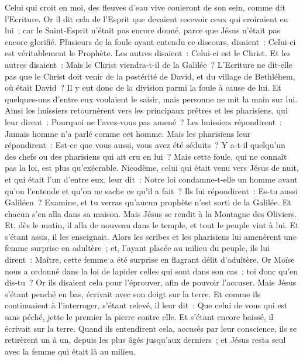 \begin{multicols}{2}
Celui qui croit en moi, des fleuves d'eau vive couleront de son sein, comme dit l'Ecriture.
Or il dit cela de l'Esprit que devaient recevoir ceux qui croiraient en lui~; car le Saint-Esprit n'était pas encore donné, parce que Jésus n'était pas encore glorifié.
Plusieurs de la foule ayant entendu ce discours, disaient~: Celui-ci est véritablement le Prophète.
Les autres disaient~: Celui-ci est le Christ. Et les autres disaient~: Mais le Christ viendra-t-il de la Galilée~?
L'Ecriture ne dit-elle pas que le Christ doit venir de la postérité de David, et du village de Bethléhem, où était David~?
Il y eut donc de la division parmi la foule à cause de lui.
Et quelques-uns d'entre eux voulaient le saisir, mais personne ne mit la main sur lui.
Ainsi les huissiers retournèrent vers les principaux prêtres et les pharisiens, qui leur dirent~: Pourquoi ne l'avez-vous pas amené~?
Les huissiers répondirent~: Jamais homme n'a parlé comme cet homme.
Mais les pharisiens leur répondirent~: Est-ce que vous aussi, vous avez été séduits~?
Y a-t-il quelqu'un des chefs ou des pharisiens qui ait cru en lui~?
Mais cette foule, qui ne connaît pas la loi, est plus qu'exécrable.
Nicodème, celui qui était venu vers Jésus de nuit, et qui était l'un d'entre eux, leur dit~:
Notre loi condamne-t-elle un homme avant qu'on l'entende et qu'on ne sache ce qu'il a fait~?
Ils lui répondirent~: Es-tu aussi Galiléen~? Examine, et tu verras qu'aucun prophète n'est sorti de la Galilée.
Et chacun s'en alla dans sa maison.
\VerseOne{}Mais Jésus se rendit à la Montagne des Oliviers.
Et, dès le matin, il alla de nouveau dans le temple, et tout le peuple vint à lui. Et s'étant assis, il les enseignait.
Alors les scribes et les pharisiens lui amenèrent une femme surprise en adultère~;
et, l'ayant placée au milieu du peuple, ils lui dirent~: Maître, cette femme a été surprise en flagrant délit d'adultère.
Or Moïse nous a ordonné dans la loi de lapider celles qui sont dans son cas~; toi donc qu'en dis-tu~?
Or ils disaient cela pour l'éprouver, afin de pouvoir l'accuser. Mais Jésus s'étant penché en bas, écrivait avec son doigt sur la terre.
Et comme ils continuaient à l'interroger, s'étant relevé, il leur dit~: Que celui de vous qui est sans péché, jette le premier la pierre contre elle.
Et s'étant encore baissé, il écrivait sur la terre.
Quand ils entendirent cela, accusés par leur conscience, ils se retirèrent un à un, depuis les plus âgés jusqu'aux derniers~; et Jésus resta seul avec la femme qui était là au milieu.

\end{multicols}

